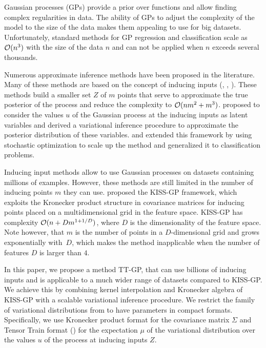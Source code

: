 Gaussian processes (GPs) provide a prior over functions and allow finding complex
regularities in data. The ability of GPs to adjust the complexity of the model
to the size of the data makes them appealing to use for big datasets.
Unfortunately, standard methods for GP regression and classification scale as
$\mathcal{O}(n^3)$ with the size of the data $n$ and can not be applied when $n$
exceeds several thousands.

Numerous approximate inference methods have been proposed in the literature. Many
of these methods are based on the concept of inducing inputs (\citet{candela2005},
\citet{snelson2006}, \citet{williams2000}). These methods build a smaller set
$Z$ of $m$ points that serve to approximate the true posterior of the process
and reduce the complexity to $\mathcal{O}(nm^2 + m^3)$. \citet{titsias2009} proposed
to consider the values $u$ of the Gaussian process at the inducing inputs
as latent variables and derived a variational inference procedure to approximate
the posterior distribution of these variables. \citet{hensman2013} and
\citet{hensman2015} extended this framework by using stochastic optimization to
scale up the method and generalized it to classification problems.

Inducing input methods allow to use Gaussian processes on datasets containing
millions of examples. However, these methods are still limited in the number
of inducing points $m$ they can use. \citet{wilson2015} proposed the KISS-GP
framework, which exploits the Kronecker product structure in covariance matrices
for inducing points placed on a multidimensional grid in the feature space.
KISS-GP has complexity $\mathcal{O}(n + D m^{1 + 1/D})$, where $D$ is the dimensionality
of the feature space. Note however, that $m$ is the number of points in a
$D$-dimensional grid and grows exponentially with~$D$, which makes the method
inapplicable when the number of features $D$ is larger than $4$.

In this paper, we propose a method TT-GP, that can use billions of inducing
inputs and is applicable to a much wider range of datasets compared to
KISS-GP.
We achieve this by combining kernel interpolation and Kronecker algebra of 
KISS-GP with a scalable variational inference procedure. We restrict the family of
variational distributions from \citet{hensman2013} to have parameters in
compact formats. Specifically, we use Kronecker product format for the
covariance matrix $\Sigma$ and Tensor Train format (\citet{oseledets2011}) for the
expectation $\mu$ of the variational distribution over the values $u$ of the
process at inducing inputs $Z$. 

